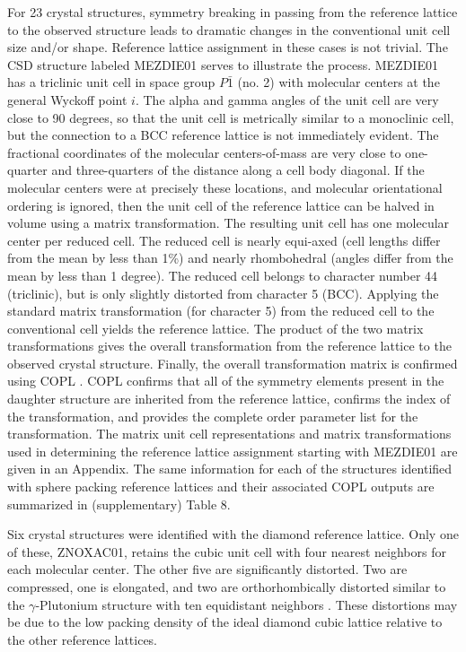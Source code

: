 \documentclass[preprint]{iucr}              %
\begin{document}
For 23 crystal structures, symmetry breaking in passing from the reference lattice to the observed structure leads to dramatic changes in the conventional unit cell size and/or shape.  Reference lattice assignment in these cases is not trivial.  The CSD structure labeled MEZDIE01 serves to illustrate the process.  MEZDIE01 has a triclinic unit cell in space group $P\bar{1}$ (no. 2) with molecular centers at the general Wyckoff point $i$.  The alpha and gamma angles of the unit cell are very close to 90 degrees, so that the unit cell is metrically similar to a monoclinic cell, but the connection to a BCC reference lattice is not immediately evident.  The fractional coordinates of the molecular centers-of-mass are very close to one-quarter and three-quarters of the distance along a cell body diagonal.  If the molecular centers were at precisely these locations, and molecular orientational ordering is ignored, then the unit cell of the reference lattice can be halved in volume using a matrix transformation.  The resulting unit cell has one molecular center per reduced cell.  The reduced cell is nearly equi-axed (cell lengths differ from the mean by less than 1\%) and nearly rhombohedral (angles differ from the mean by less than 1 degree).  The reduced cell belongs to character number 44 (triclinic), but is only slightly distorted from character 5 (BCC).  Applying the standard matrix transformation (for character 5) from the reduced cell to the conventional cell yields the reference lattice.  The product of the two matrix transformations gives the overall transformation from the reference lattice to the observed crystal structure.  Finally, the overall transformation matrix is confirmed using COPL \cite{Stokes07}.  COPL confirms that all of the symmetry elements present in the daughter structure are inherited from the reference lattice, confirms the index of the transformation, and provides the complete order parameter list for the transformation.  The matrix unit cell representations and matrix transformations used in determining the reference lattice assignment starting with MEZDIE01 are given in an Appendix.  The same information for each of the structures identified with sphere packing reference lattices and their associated COPL outputs are summarized in (supplementary) Table 8.

Six crystal structures were identified with the diamond reference lattice.  Only one of these, ZNOXAC01, retains the cubic unit cell with four nearest neighbors for each molecular center.  The other five are significantly distorted.  Two are compressed, one is elongated, and two are orthorhombically distorted similar to the $\gamma$-Plutonium structure with ten equidistant neighbors \cite{NRL08}.  These distortions may be due to the low packing density of the ideal diamond cubic lattice relative to the other reference lattices.
\end{document}
